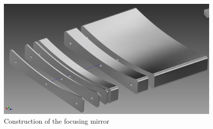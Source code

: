 \begin{figure}[h]
\includegraphics[width=\textwidth]{img/mirror_render.jpg}
\caption{Construction of the focusing mirror}
\label{fig:mirror-render}
\end{figure}
